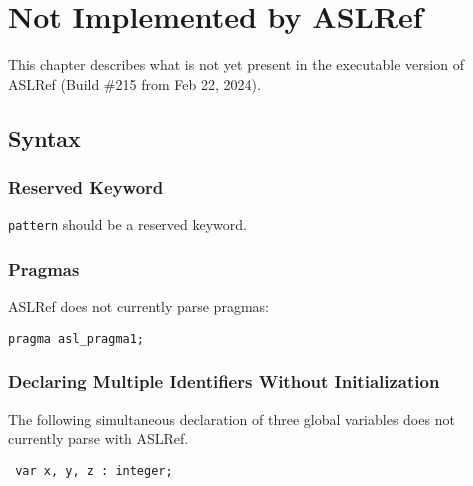 % 

% 


% 

% 

\chapter{Not Implemented by ASLRef\label{appendix:UnimplementedInASLRef}}

This chapter describes what is not yet present in the executable version of ASLRef
(Build \#215 from Feb 22, 2024).

\section{Syntax}

\subsection{Reserved Keyword}
\texttt{pattern} should be a reserved keyword.

\subsection{Pragmas}
ASLRef does not currently parse pragmas:
\begin{verbatim}
pragma asl_pragma1;
\end{verbatim}


\subsection{Declaring Multiple Identifiers Without Initialization}
The following simultaneous declaration of three global variables does not currently parse with ASLRef.
\begin{verbatim}
 var x, y, z : integer;
\end{verbatim}

